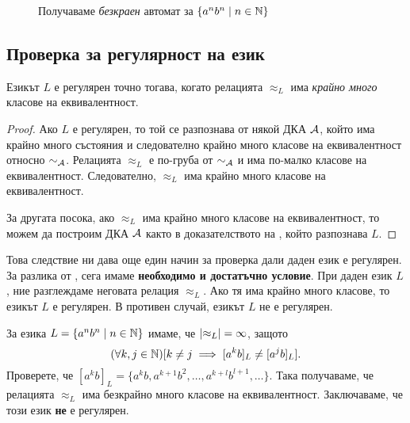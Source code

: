 \begin{example}
\begin{figure}[H]
    \caption{Получаваме {\em безкраен} автомат за $\{a^nb^n \mid n \in \mathbb{N}\}$}
  \end{figure}    
\end{example}



\subsection{Проверка за регулярност на език}

\begin{framed}
  \begin{prop}
    Езикът $L$ е регулярен точно тогава, когато релацията $\approx_L$ има {\em крайно много} класове на еквивалентност.
  \end{prop}
\end{framed}
\begin{proof}
  Ако $L$ е регулярен, то той се разпознава от някой ДКА $\mathcal{A}$, който има крайно много състояния 
  и следователно крайно много класове на еквивалентност относно $\sim_{\mathcal{A}}$.
  Релацията $\approx_L$ е по-груба от $\sim_{\mathcal{A}}$ и има по-малко класове на еквивалентност.
  Следователно, $\approx_L$ има крайно много класове на еквивалентност.
  
  За другата посока, ако $\approx_L$ има крайно много класове на еквивалентност, то можем да 
  построим ДКА $\mathcal{A}$ както в доказателството на , който разпознава $L$.
\end{proof}

Това следствие ни дава още един начин за проверка дали даден език е регулярен.
За разлика от , сега имаме {\bf необходимо и достатъчно условие}.
При даден език $L$, ние разглеждаме неговата релация $\approx_L$.
Ако тя има крайно много класове, то езикът $L$ е регулярен.
В противен случай, езикът $L$ не е регулярен.

\begin{example}
  За езика $L = \{a^nb^n\mid n \in \mathbb{N}\}$ имаме, че $\lvert{\approx_L}\rvert = \infty$,
  защото \[(\forall k,j\in\mathbb{N})[k \neq j \implies [a^kb]_L \neq [a^jb]_L].\]
  Проверете, че $[a^kb]_L = \{a^kb,a^{k+1}b^{2},\dots,a^{k+l}b^{l+1},\dots\}$.
  Така получаваме, че релацията $\approx_L$ има безкрайно много класове на еквивалентност.
  Заключаваме, че този език {\bf не} е регулярен.
\end{example}

